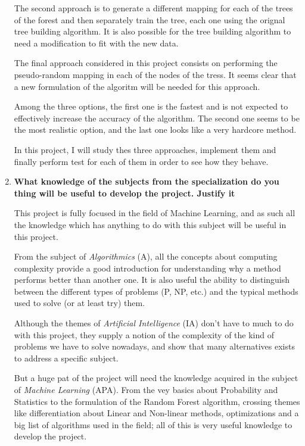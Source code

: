 \documentclass[a4paper]{article}
\begin{document}
\begin{enumerate}
        The second approach is to generate a different mapping for each of the trees of the forest and then separately train the tree, each one using the orignal tree building algorithm. It is also possible for the tree building algorithm to need a modification to fit with the new data.

        The final approach considered in this project consists on performing the pseudo-random mapping in each of the nodes of the tress. It seems clear that a new formulation of the algoritm will be needed for this approach.

        Among the three options, the first one is the fastest and is not expected to effectively increase the accuracy of the algorithm. The second one seems to be the most realistic option, and the last one looks like a very hardcore method.

        In this project, I will study thes three approaches, implement them and finally perform test for each of them in order to see how they behave.

        \item \textbf{What knowledge of the subjects from the specialization do you thing will be useful to develop the project. Justify it}

        This project is fully focused in the field of Machine Learning, and as such all the knowledge which has anything to do with this subject will be useful in this project.

        From the subject of \textit{Algorithmics} (A), all the concepts about computing complexity provide a good introduction for understanding why a method performs better than another one. It is also useful the ability to distinguish between the different types of problems (P, NP, etc.) and the typical methods used to solve (or at least try) them.

        Although the themes of \textit{Artificial Intelligence} (IA) don't have to much to do with this project, they supply a notion of the complexity of the kind of problems we have to solve nowadays, and show that many alternatives exists to address a specific subject.

        But a huge pat of the project will need the knowledge acquired in the subject of \textit{Machine Learning} (APA). From the vey basics about Probability and Statistics to the formulation of the Random Forest algorithm, crossing themes like differentiation about Linear and Non-linear methods, optimizations and a big list of algorithms used in the field; all of this is very useful knowledge to develop the project.


\end{enumerate}
\end{document}
